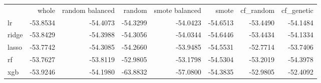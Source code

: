 \begin{tabular}{lrrrrrrr}
 & whole & random balanced & random & smote balanced & smote & cf_random & cf_genetic \\
lr & -53.8534 & -54.4073 & -54.3299 & -54.0423 & -54.6513 & -53.4490 & -54.1484 \\
ridge & -53.8429 & -54.3988 & -54.3056 & -54.0344 & -54.6446 & -53.4434 & -54.1334 \\
lasso & -53.7742 & -54.3085 & -54.2660 & -53.9485 & -54.5531 & -52.7714 & -53.7406 \\
rf & -53.7627 & -53.8119 & -52.9805 & -53.1798 & -54.5304 & -53.2019 & -54.3978 \\
xgb & -53.9246 & -54.1980 & -63.8832 & -57.0800 & -54.3835 & -52.9805 & -52.4092 \\
\end{tabular}
